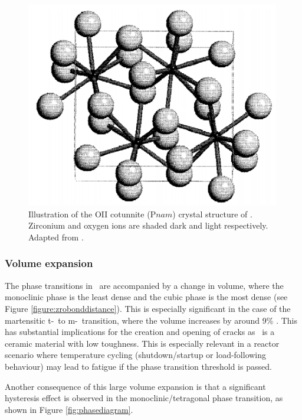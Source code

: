 \begin{figure}[htp]
  \centering
      \includegraphics[height=9cm]{images/orthorhombic_II.png}
  \caption[Illustration of the OII cotunnite (P$nam$) crystal structure of \zirconia . Zirconium and oxygen ions are shaded dark and light respectively.]{Illustration of the OII cotunnite (P$nam$) crystal structure of \zirconia . Zirconium and oxygen ions are shaded dark and light respectively. Adapted from \cite{Haines1997}.}
  \label{fig:cotunnite_structure}
\end{figure}

\subsubsection*{Volume expansion}

The phase transitions in \zirconia\ are accompanied by a change in volume, where the monoclinic phase is the least dense and the cubic phase is the most dense (see Figure \ref{figure:zrobonddistance}). This is especially significant in the case of the martensitic t-\zirconia\ to m-\zirconia\ transition, where the volume increases by around 9\% \cite{Gupta1977}. This has substantial implications for the creation and opening of cracks as \zirconia\ is a ceramic material with low toughness. This is especially relevant in a reactor scenario where temperature cycling (shutdown/startup or load-following behaviour) may lead to fatigue if the phase transition threshold is passed.

Another consequence of this large volume expansion is that a significant hysteresis effect is observed in the monoclinic/tetragonal phase transition, as shown in Figure \ref{fig:phasediagram}. 

